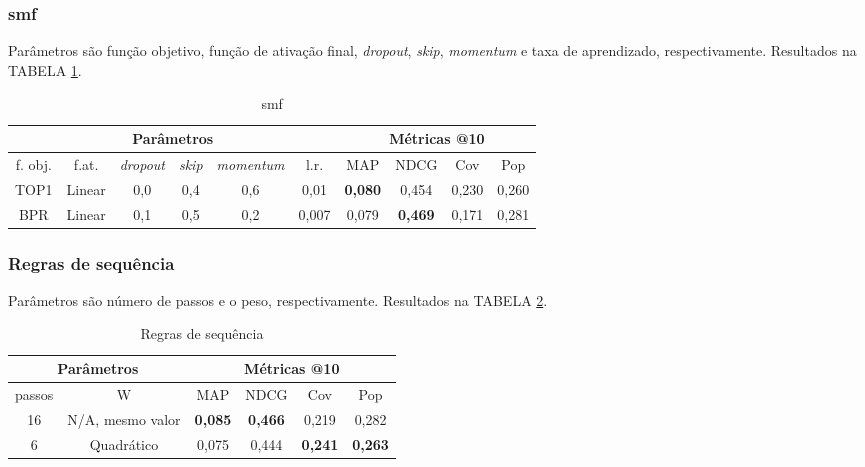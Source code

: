 \subsubsection{smf}
Parâmetros são função objetivo, função de ativação final, \textit{dropout},
\textit{skip}, \textit{momentum} e taxa de aprendizado, respectivamente.
Resultados na TABELA \ref{opt:smf_rem}.

\begin{table}[htbp]
  \centering
  \begin{tabular}{|c|c|c|c|c|c|c|c|c|c|}
    \hline
      \multicolumn{6}{|c|}{Parâmetros} & \multicolumn{4}{c|}{Métricas @10} \\
      \hline
      f. obj. & f.at. & \textit{dropout} & \textit{skip} & \textit{momentum} & l.r. & MAP & NDCG & Cov & Pop \\
      \hline
      TOP1 & Linear & 0,0 & 0,4 & 0,6 & 0,01 & \textbf{0,080} & 0,454 & 0,230 & 0,260 \\
      \hline
      BPR & Linear & 0,1 & 0,5 & 0,2 & 0,007 & 0,079 & \textbf{0,469} & 0,171 & 0,281 \\
      \hline
      \end{tabular}
      \caption{smf}
      \label{opt:smf_rem}
\end{table}

\subsubsection{Regras de sequência}
Parâmetros são número de passos e o peso, respectivamente. Resultados na TABELA
\ref{opt:sr_rem}.

\begin{table}[htbp]
  \centering
  \begin{tabular}{|c|c|c|c|c|c|}
    \hline
      \multicolumn{2}{|c|}{Parâmetros} & \multicolumn{4}{c|}{Métricas @10} \\
      \hline
      passos & W & MAP & NDCG & Cov & Pop \\
      \hline
      16 & N/A, mesmo valor & \textbf{0,085} & \textbf{0,466} & 0,219 & 0,282 \\
      \hline
      6 & Quadrático & 0,075 & 0,444 & \textbf{0,241} & \textbf{0,263} \\
      \hline
\end{tabular}
      \caption{Regras de sequência}
      \label{opt:sr_rem}
\end{table}

